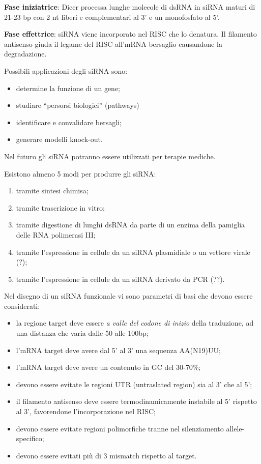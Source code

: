 \documentclass[]{article}
\begin{document}
\textbf{Fase iniziatrice}: Dicer processa lunghe molecole di dsRNA in
siRNA maturi di 21-23 bp con 2 nt liberi e complementari al 3' e un
monofosfato al 5'.

\textbf{Fase effettrice}: siRNA viene incorporato nel RISC che lo
denatura. Il filamento antisenso giuda il legame del RISC all'mRNA
bersaglio causandone la degradazione.

Possibili applicazioni degli siRNA sono:

\begin{itemize}
\itemsep1pt\parskip0pt
\item
  determine la funzione di un gene;
\item
  studiare ``persorsi biologici'' (pathways)
\item
  identificare e convalidare bersagli;
\item
  generare modelli knock-out.
\end{itemize}

Nel futuro gli siRNA potranno essere utilizzati per terapie mediche.

Esistono almeno 5 modi per produrre gli siRNA:

\begin{enumerate}
\def\labelenumi{\arabic{enumi}.}
\itemsep1pt\parskip0pt
\item
  tramite sintesi chimisa;
\item
  tramite trascrizione in vitro;
\item
  tramite digestione di lunghi dsRNA da parte di un enzima della
  pamiglia delle RNA polimerasi III;
\item
  tramite l'espressione in cellule da un siRNA plasmidiale o un vettore
  virale (?);
\item
  tramite l'espressione in cellule da un siRNA derivato da PCR (??).
\end{enumerate}

Nel disegno di un siRNA funzionale vi sono parametri di basi che devono
essere considerati:

\begin{itemize}
\itemsep1pt\parskip0pt
\item
  la regione target deve essere \emph{a valle del codone di inizio}
  della traduzione, ad una distanza che varia dalle 50 alle 100bp;
\item
  l'mRNA target deve avere dal 5' al 3' una sequenza AA(N19)UU;
\item
  l'mRNA target deve avere un contenuto in GC del 30-70\%;
\item
  devono essere evitate le regioni UTR (untraslated region) sia al 3'
  che al 5';
\item
  il filamento antisenso deve essere termodinamicamente instabile al 5'
  rispetto al 3', favorendone l'incorporazione nel RISC;
\item
  devono essere evitate regioni polimorfiche tranne nel silenziamento
  allele-specifico;
\item
  devono essere evitati più di 3 mismatch rispetto al target.
\end{itemize}
\end{document}

